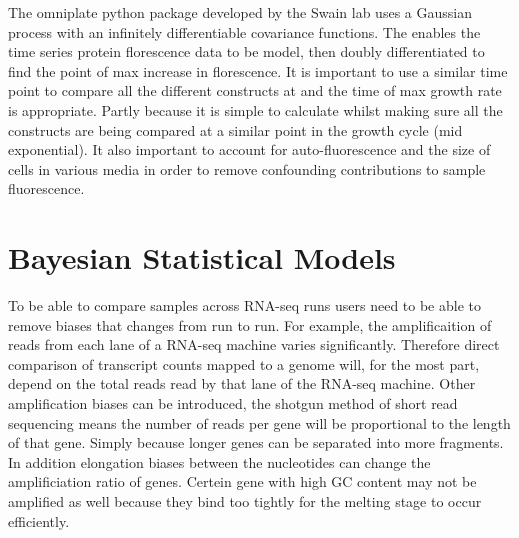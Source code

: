 \documentclass{SBCbookchapter}
\begin{document}
The omniplate python package developed by the Swain lab uses a Gaussian process with an infinitely differentiable covariance functions. The enables the time series protein florescence data to be model, then doubly differentiated to find the point of max increase in florescence. It is important to use a similar time point to compare all the different constructs at and the time of max growth rate is appropriate. Partly because it is simple to calculate whilst making sure all the constructs are being compared at a similar point in the growth cycle (mid exponential). It also important to account for auto-fluorescence and the size of cells in various media in order to remove confounding contributions to sample fluorescence.

\section{Bayesian Statistical Models}

To be able to compare samples across RNA-seq runs users need to be able to remove biases that changes from run to run. For example, the amplificaition of reads from each lane of a RNA-seq machine varies significantly. Therefore direct comparison of transcript counts mapped to a genome will, for the most part, depend on the total reads read by that lane of the RNA-seq machine.  Other amplification biases can be introduced, the shotgun method of short read sequencing means the number of reads per gene will be proportional to the length of that gene. Simply because longer genes can be separated into more fragments. In addition elongation biases between the nucleotides can change the amplificiation ratio of genes. Certein gene with high GC content may not be amplified as well because they bind too tightly for the melting stage to occur efficiently. 
\end{document}
